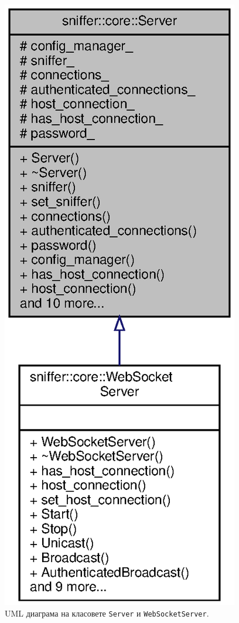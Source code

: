 \documentclass[12pt,a4paper,oneside]{book}
\begin{document}
\begin{figure}[h!]
  \centering
  \includegraphics[scale=.7]{figures/server_websocketserver_uml.eps}
  \caption{UML диаграма на класовете \texttt{Server} и \texttt{WebSocketServer}.}
  \label{server_websocketserver_uml_fig}
\end{figure}
\end{document}
